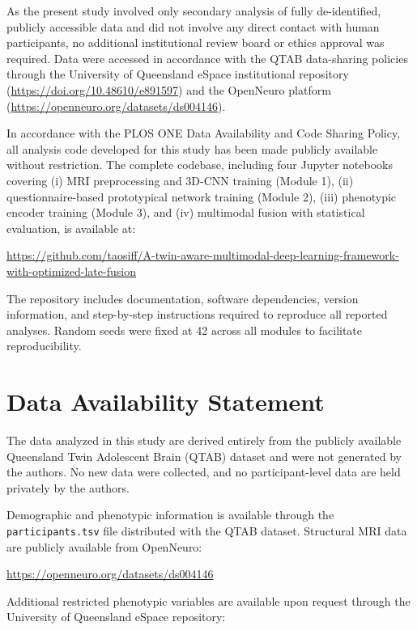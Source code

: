 \documentclass[10pt,letterpaper]{article}
\begin{document}
As the present study involved only secondary analysis of fully de-identified, publicly accessible data and did not involve any direct contact with human participants, no additional institutional review board or ethics approval was required. Data were accessed in accordance with the QTAB data-sharing policies through the University of Queensland eSpace institutional repository (\url{https://doi.org/10.48610/e891597}) and the OpenNeuro platform (\url{https://openneuro.org/datasets/ds004146}).

In accordance with the PLOS ONE Data Availability and Code Sharing Policy, all analysis code developed for this study has been made publicly available without restriction. The complete codebase, including four Jupyter notebooks covering (i) MRI preprocessing and 3D-CNN training (Module 1), (ii) questionnaire-based prototypical network training (Module 2), (iii) phenotypic encoder training (Module 3), and (iv) multimodal fusion with statistical evaluation, is available at:

\begin{center}
\url{https://github.com/taosiff/A-twin-aware-multimodal-deep-learning-framework-with-optimized-late-fusion}
\end{center}

The repository includes documentation, software dependencies, version information, and step-by-step instructions required to reproduce all reported analyses. Random seeds were fixed at 42 across all modules to facilitate reproducibility.

\section*{Data Availability Statement}

The data analyzed in this study are derived entirely from the publicly available Queensland Twin Adolescent Brain (QTAB) dataset and were not generated by the authors. No new data were collected, and no participant-level data are held privately by the authors.

Demographic and phenotypic information is available through the \texttt{participants.tsv} file distributed with the QTAB dataset. Structural MRI data are publicly available from OpenNeuro:

\begin{center}
\url{https://openneuro.org/datasets/ds004146}
\end{center}

Additional restricted phenotypic variables are available upon request through the University of Queensland eSpace repository:
\end{document}

